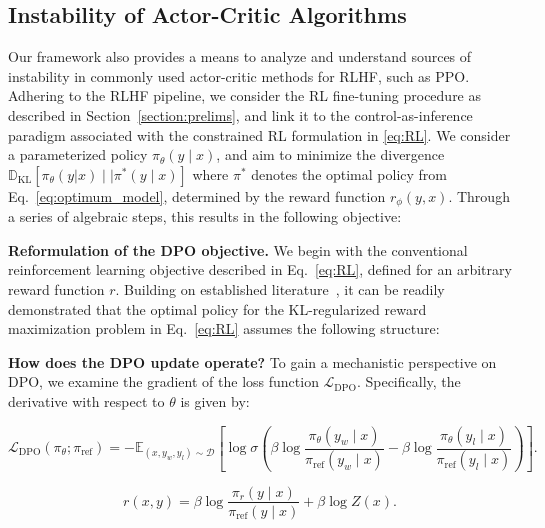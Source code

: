 \subsection{Instability of Actor-Critic Algorithms} Our framework also provides a means to analyze and understand sources of instability in commonly used actor-critic methods for RLHF, such as PPO. Adhering to the RLHF pipeline, we consider the RL fine-tuning procedure as described in Section~\ref{section:prelims}, and link it to the control-as-inference paradigm \cite{levine2018reinforcement} associated with the constrained RL formulation in \ref{eq:RL}. We consider a parameterized policy $\pi_{\theta}(y\mid x)$, and aim to minimize the divergence $\mathbb{D}_{\text{KL}}[\pi_{\theta}(y|x) \mid \mid \pi^*(y\mid x)]$ where $\pi^*$ denotes the optimal policy from Eq.~\ref{eq:optimum_model}, determined by the reward function $r_{\phi}(y, x)$. Through a series of algebraic steps, this results in the following objective:

\textbf{Reformulation of the DPO objective.} We begin with the conventional reinforcement learning objective described in Eq.~\ref{eq:RL}, defined for an arbitrary reward function $r$. Building on established literature~\citep{peters2007reinforcement, peng2019advantage, korbak2022reinforcement, go2023aligning}, it can be readily demonstrated that the optimal policy for the KL-regularized reward maximization problem in Eq.~\ref{eq:RL} assumes the following structure:

\textbf{How does the DPO update operate?} To gain a mechanistic perspective on DPO, we examine the gradient of the loss function $\mathcal{L}_\text{DPO}$. Specifically, the derivative with respect to $\theta$ is given by:

\begin{equation}\label{eq:optimum_model}
    \mathcal{L}_\text{DPO}(\pi_{\theta}; \pi_\text{ref}) = -\mathbb{E}_{(x, y_w, y_l)\sim \mathcal{D}}\left[\log \sigma \left(\beta \log \frac{\pi_{\theta}(y_w\mid x)}{\pi_\text{ref}(y_w\mid x)} - \beta \log \frac{\pi_{\theta}(y_l\mid x)}{\pi_\text{ref}(y_l\mid x)}\right)\right].
\end{equation}

\begin{equation}\label{eq:main_eq}
    r(x,y) =\beta \log \frac{\pi_r(y\mid x)}{\pi_\text{ref}(y\mid x)} + \beta \log Z(x).
\end{equation}

